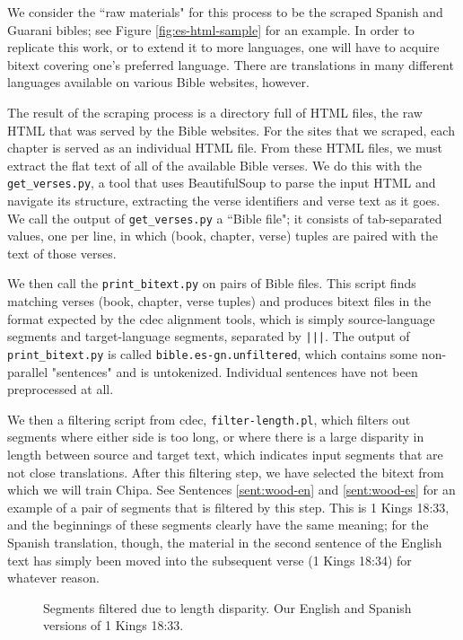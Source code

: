 We consider the ``raw materials" for this process to be the scraped Spanish and
Guarani bibles; see Figure \ref{fig:es-html-sample} for an example.  In order
to replicate this work, or to extend it to more languages, one will have to
acquire bitext covering one's preferred language. There are translations in
many different languages available on various Bible websites, however.

The result of the scraping process is a directory full of HTML files, the raw
HTML that was served by the Bible websites. For the sites that we scraped, each
chapter is served as an individual HTML file. From these HTML files, we must
extract the flat text of all of the available Bible verses.  We do this with
the \texttt{get\_verses.py}, a tool that uses BeautifulSoup to parse the input
HTML and navigate its structure, extracting the verse identifiers and verse
text as it goes. We call the output of \texttt{get\_verses.py} a ``Bible file";
it consists of tab-separated values, one per line, in which (book, chapter,
verse) tuples are paired with the text of those verses.

We then call the \texttt{print\_bitext.py} on pairs of Bible files. This script
finds matching verses (book, chapter, verse tuples) and produces bitext files
in the format expected by the cdec alignment tools, which is simply
source-language segments and target-language segments, separated by
\texttt{|||}. The output of \texttt{print\_bitext.py} is called
\texttt{bible.es-gn.unfiltered}, which contains some non-parallel "sentences"
and is untokenized. Individual sentences have not been preprocessed at all.

We then a filtering script from cdec, \texttt{filter-length.pl}, which filters
out segments where either side is too long, or where there is a large disparity
in length between source and target text, which indicates input segments that
are not close translations. After this filtering step, we have selected the
bitext from which we will train Chipa. See Sentences \ref{sent:wood-en} and
\ref{sent:wood-es} for an example of a pair of segments that is filtered by
this step. This is 1 Kings 18:33, and the beginnings of these segments clearly
have the same meaning; for the Spanish translation, though, the material in the
second sentence of the English text has simply been moved into the subsequent
verse (1 Kings 18:34) for whatever reason.

\begin{figure}
\label{sent:wood-en}
\label{sent:wood-es}
  \caption{Segments filtered due to length disparity. Our English and Spanish
  versions of 1 Kings 18:33.}
  \label{fig:length-disparity}
\end{figure}

